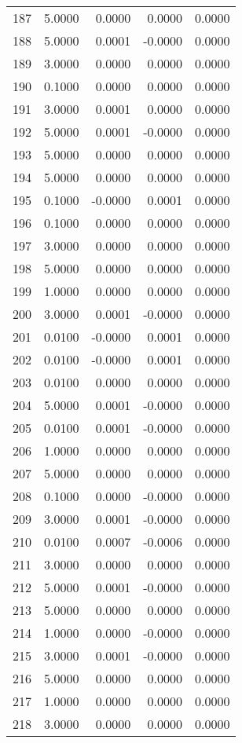 \begin{longtable}{lrrrr}
187 & 5.0000 & 0.0000 & 0.0000 & 0.0000 \\
188 & 5.0000 & 0.0001 & -0.0000 & 0.0000 \\
189 & 3.0000 & 0.0000 & 0.0000 & 0.0000 \\
190 & 0.1000 & 0.0000 & 0.0000 & 0.0000 \\
191 & 3.0000 & 0.0001 & 0.0000 & 0.0000 \\
192 & 5.0000 & 0.0001 & -0.0000 & 0.0000 \\
193 & 5.0000 & 0.0000 & 0.0000 & 0.0000 \\
194 & 5.0000 & 0.0000 & 0.0000 & 0.0000 \\
195 & 0.1000 & -0.0000 & 0.0001 & 0.0000 \\
196 & 0.1000 & 0.0000 & 0.0000 & 0.0000 \\
197 & 3.0000 & 0.0000 & 0.0000 & 0.0000 \\
198 & 5.0000 & 0.0000 & 0.0000 & 0.0000 \\
199 & 1.0000 & 0.0000 & 0.0000 & 0.0000 \\
200 & 3.0000 & 0.0001 & -0.0000 & 0.0000 \\
201 & 0.0100 & -0.0000 & 0.0001 & 0.0000 \\
202 & 0.0100 & -0.0000 & 0.0001 & 0.0000 \\
203 & 0.0100 & 0.0000 & 0.0000 & 0.0000 \\
204 & 5.0000 & 0.0001 & -0.0000 & 0.0000 \\
205 & 0.0100 & 0.0001 & -0.0000 & 0.0000 \\
206 & 1.0000 & 0.0000 & 0.0000 & 0.0000 \\
207 & 5.0000 & 0.0000 & 0.0000 & 0.0000 \\
208 & 0.1000 & 0.0000 & -0.0000 & 0.0000 \\
209 & 3.0000 & 0.0001 & -0.0000 & 0.0000 \\
210 & 0.0100 & 0.0007 & -0.0006 & 0.0000 \\
211 & 3.0000 & 0.0000 & 0.0000 & 0.0000 \\
212 & 5.0000 & 0.0001 & -0.0000 & 0.0000 \\
213 & 5.0000 & 0.0000 & 0.0000 & 0.0000 \\
214 & 1.0000 & 0.0000 & -0.0000 & 0.0000 \\
215 & 3.0000 & 0.0001 & -0.0000 & 0.0000 \\
216 & 5.0000 & 0.0000 & 0.0000 & 0.0000 \\
217 & 1.0000 & 0.0000 & 0.0000 & 0.0000 \\
218 & 3.0000 & 0.0000 & 0.0000 & 0.0000 \\

\end{longtable}
